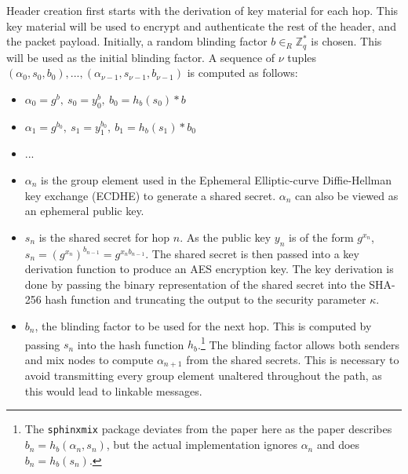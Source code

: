 \documentclass[final,dissertation.tex]{subfiles}
\begin{document}
Header creation first starts with the derivation of key material for each hop. This key material will be used to encrypt and authenticate the rest of the header, and the packet payload. Initially, a random blinding factor $b \in_R \mathbb{Z}^*_q$ is chosen. This will be used as the initial blinding factor. A sequence of $\nu$ tuples $(\alpha_0, s_0, b_0),...,(\alpha_{\nu-1}, s_{\nu-1}, b_{\nu-1})$ is computed as follows:

\begin{itemize}
	\setlength\itemsep{-0.4em}
	\item $\alpha_0 = g^b,\ s_0 = y_0^b,\ b_0 = h_b(s_0)*b$
	\item $\alpha_1 = g^{b_0},\ s_1 = y_1^{b_0},\ b_1 = h_b(s_1)*b_0$
	\item ...
\end{itemize}

\begin{itemize}
	\item $\alpha_n$ is the group element used in the Ephemeral Elliptic-curve Diffie-Hellman key exchange (ECDHE) to generate a shared secret. $\alpha_n$ can also be viewed as an ephemeral public key. 
	
	\item $s_n$ is the shared secret for hop $n$. 
	As the public key $y_n$ is of the form $g^{x_n}$, $s_n = (g^{x_n})^{b_{n-1}} = g^{{x_n}{b_{n-1}}}$. The shared secret is then passed into a key derivation function to produce an AES encryption key. The key derivation is done by passing the binary representation of the shared secret into the SHA-256 hash function and truncating the output to the security parameter $\kappa$.
	
	\item $b_n$, the blinding factor to be used for the next hop. This is computed by passing $s_n$ into the hash function $h_b$.\footnote{The \verb|sphinxmix| package deviates from the paper here as the paper describes $b_n = h_b(\alpha_n, s_n)$, but the actual implementation ignores $\alpha_n$ and does $b_n = h_b(s_n)$.}
	The blinding factor allows both senders and mix nodes to compute $\alpha_{n+1}$ from the shared secrets. This is necessary to avoid transmitting every group element unaltered throughout the path, as this would lead to linkable messages.
\end{itemize}
\end{document}
